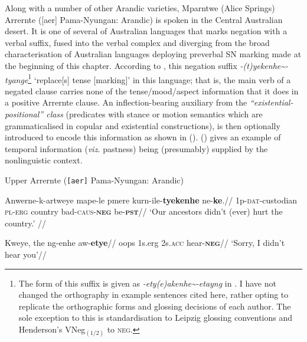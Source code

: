 \documentclass[usenames,dvipsnames,11pt]{article}
\begin{document}
{Along with a number of other Arandic varieties, Mparntwe (Alice Springs) Arrernte ([\gls{aer}] Pama-Nyungan: Arandic) is spoken in the Central Australian desert. It is one of several of Australian languages that marks negation with a verbal suffix, fused into the verbal complex and diverging from the broad characterisation of Australian languages deploying preverbal SN marking made at the beginning of this chapter.  According to \citet[71]{Wilkins1989}, this negation suffix \textit{-(t)yekenhe\textasciitilde-tyange}\footnote{The form of this suffix is given as \textit{-ety(e)\textdblhyphen akenhe\textasciitilde-etayng} in \citealt{Henderson2013}. I have not changed the orthography in example sentences cited here, rather opting to replicate the orthographic forms and glossing decisions of each author. The sole exception to this is standardisation to Leipzig glossing conventions and Henderson's VNeg$_{(1/2)} $ to \textsc{neg}.} `replace[s] tense [marking]' in this language; that is, the main verb of a negated clause carries none of the tense/mood/aspect information that it does in a positive Arrernte clause. An inflection-bearing auxiliary from the \textit{``existential-positional'' class} (predicates with stance or motion semantics which are grammaticalised in copular and existential constructions), is then optionally introduced to encode this information as shown in (). () gives an example of temporal information (\textit{viz.} pastness) being (presumably) supplied by the nonlinguistic context.

\pex\label{sn-aec} Upper Arrernte (\texttt{[aer]} Pama-Nyungan: Arandic)

\a\begingl \gla Anwerne-k-artweye mape-le pmere kurn-ile-\textbf{tyekenhe} ne-\textbf{ke}.//
\glb 1p\textsc{-dat-}custodian \textsc{pl-erg} country bad\textsc{-caus-\textbf{neg}} be-\textsc{\textbf{pst}}//
\glft`Our ancestors didn't (ever) hurt the country.' //\endgl



\a\begingl\gla Kweye, the ng-enhe aw-\textbf{etye}//
\glb oops 1s.\gls{erg} 2s.\textsc{acc} hear-\textbf{\textsc{neg}}//
\glft`Sorry, I didn't hear you'//\endgl

\xe

\iffalse\ex
\a\begingl Anwerne itele\textdblhyphen{ar}-etye\textdblhyphen{kwenye}

\xe\fi

}
\end{document}
